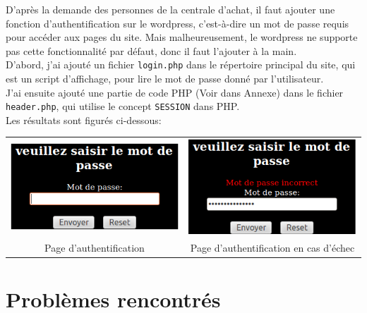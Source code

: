 D'après la demande des personnes de la centrale d'achat, il faut ajouter une fonction d'authentification sur le wordpress, c'est-à-dire un mot de passe requis pour accéder aux pages du site. Mais malheureusement, le wordpress ne supporte pas cette fonctionnalité par défaut, donc il faut l'ajouter à la main.\\

D'abord, j'ai ajouté un fichier \texttt{login.php} dans le répertoire principal du site, qui est un script d'affichage, pour lire le mot de passe donné par l'utilisateur.\\

J'ai ensuite ajouté une partie de code PHP (Voir dans Annexe) dans le fichier \texttt{header.php}, qui utilise le concept \texttt{SESSION} dans PHP.\\

Les résultats sont figurés ci-dessous:\\

\begin{center}
\begin{tabular}{c c}
\includegraphics[scale=0.7]{images/auth1} & \includegraphics[scale=0.64]{images/auth2} \\
Page d'authentification & Page d'authentification en cas d'échec
\end{tabular}
\end{center}
\section{Problèmes rencontrés}

